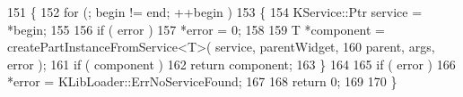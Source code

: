 \begin{DoxyCode}
151          \{
152             \textcolor{keywordflow}{for} (; begin != end; ++begin )
153             \{
154                 KService::Ptr service = *begin;
155 
156                 \textcolor{keywordflow}{if} ( error )
157                     *error = 0;
158 
159                 T *component = createPartInstanceFromService<T>( service, parentWidget,
160                                                                  parent, args, error );
161                 \textcolor{keywordflow}{if} ( component )
162                     \textcolor{keywordflow}{return} component;
163             \}
164 
165             \textcolor{keywordflow}{if} ( error )
166                 *error = KLibLoader::ErrNoServiceFound;
167 
168             \textcolor{keywordflow}{return} 0;
169 
170         \}
\end{DoxyCode}
